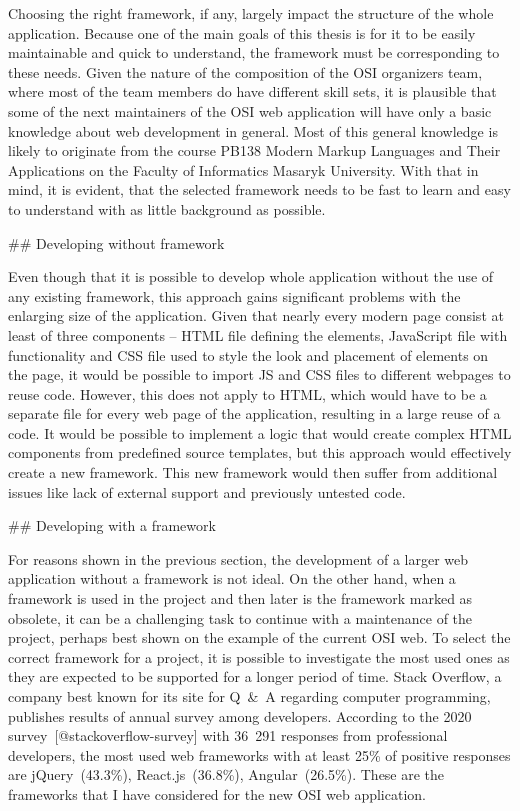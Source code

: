 \documentclass[
  digital, %
  oneside, %
  lof,     %
  lot,     %
]{fithesis4}
\begin{document}
{Choosing the right framework, if any, largely impact the structure of the whole application. Because one of the main goals of this thesis is for it to be easily maintainable and quick to understand, the framework must be corresponding to these needs. Given the nature of the composition of the OSI organizers team, where most of the team members do have different skill sets, it is plausible that some of the next maintainers of the OSI web application will have only a basic knowledge about web development in general. Most of this general knowledge is likely to originate from the course PB138 Modern Markup Languages and Their Applications on the Faculty of Informatics Masaryk University. With that in mind, it is evident, that the selected framework needs to be fast to learn and easy to understand with as little background as possible.

## Developing without framework

Even though that it is possible to develop whole application without the use of any existing framework, this approach gains significant problems with the enlarging size of the application. Given that nearly every modern page consist at least of three components -- HTML file defining the elements, JavaScript file with functionality and CSS file used to style the look and placement of elements on the page, it would be possible to import JS and CSS files to different webpages to reuse code. However, this does not apply to HTML, which would have to be a separate file for every web page of the application, resulting in a large reuse of a code. It would be possible to implement a logic that would create complex HTML components from predefined source templates, but this approach would effectively create a new framework. This new framework would then suffer from additional issues like lack of external support and previously untested code.

## Developing with a framework

For reasons shown in the previous section, the development of a larger web application without a framework is not ideal. On the other hand, when a framework is used in the project and then later is the framework marked as obsolete, it can be a challenging task to continue with a maintenance of the project, perhaps best shown on the example of the current OSI web. To select the correct framework for a project, it is possible to investigate the most used ones as they are expected to be supported for a longer period of time. Stack Overflow, a company best known for its site for Q~\&~A regarding computer programming, publishes results of annual survey among developers. According to the 2020 survey~[@stackoverflow-survey] with 36~291 responses from professional developers, the most used web frameworks with at least 25\% of positive responses are jQuery~(43.3\%), React.js~(36.8\%), Angular~(26.5\%). These are the frameworks that I have considered for the new OSI web application.

}
\end{document}
